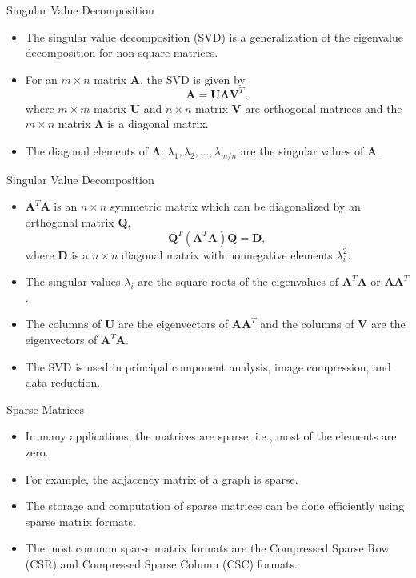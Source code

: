 \documentclass{beamer}
\begin{document}
\begin{frame}{Singular Value Decomposition}
    \begin{itemize}
        \item The singular value decomposition (SVD) is a generalization of the eigenvalue decomposition for non-square matrices.
        \item For an $m\times n$ matrix $\mathbf{A}$, the SVD is given by
        \[
        \mathbf{A}=\mathbf{U} \boldsymbol{\Lambda} \mathbf{V}^T,
        \] where  $m\times m$ matrix $\mathbf{U}$ and $n\times n$ matrix $\mathbf{V} $ are orthogonal matrices 
        and the $m\times n$ matrix $\boldsymbol{\Lambda}$ is a diagonal matrix.
        \item The diagonal elements of $\boldsymbol{\Lambda}$: $\lambda_1, \lambda_2, \ldots, \lambda_{m/n}$ are the singular values of $\mathbf{A}$.
        
    \end{itemize}
\end{frame}
\begin{frame}{Singular Value Decomposition}
    \begin{itemize}
        \item $\mathbf{A}^T \mathbf{A}$ is an $n\times n$ symmetric matrix which can be diagonalized
        by an orthogonal matrix $\mathbf{Q}$, 
        \[
        \mathbf{Q}^T \left(\mathbf{A}^T \mathbf{A} \right)\mathbf{Q}=\mathbf{D},
        \]
        where $\mathbf{D}$ is a $n\times n$ diagonal matrix with nonnegative elements $\lambda_i^2$.
        \item The singular values $\lambda_i$ are the square roots of the eigenvalues of $\mathbf{A}^T \mathbf{A}$ or $\mathbf{A} \mathbf{A}^T$.
        \item The columns of $\mathbf{U}$ are the eigenvectors of $\mathbf{A} \mathbf{A}^T$ and the columns of $\mathbf{V}$ are the eigenvectors of $\mathbf{A}^T \mathbf{A}$.
        \item The SVD is used in principal component analysis, image compression, and data reduction.
    \end{itemize}
\end{frame}
\begin{frame}{Sparse Matrices}
    \begin{itemize}
        \item In many applications, the matrices are sparse, i.e., most of the elements are zero.
        \item For example, the adjacency matrix of a graph is sparse.
        \item The storage and computation of sparse matrices can be done efficiently using sparse matrix formats.
        \item The most common sparse matrix formats are the Compressed Sparse Row (CSR)
         and Compressed Sparse Column (CSC) formats.
    \end{itemize}
\end{frame}
\end{document}
